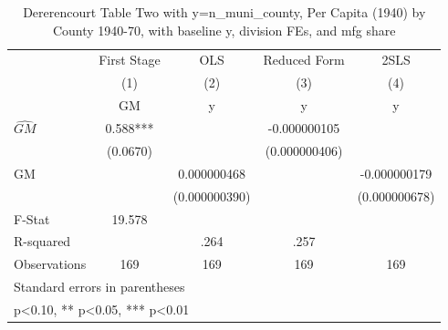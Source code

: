 \begin{table}[htbp]\centering
\def\sym#1{\ifmmode^{#1}\else\(^{#1}\)\fi}
\caption{Dererencourt Table Two with y=n\_muni\_county, Per Capita (1940) by County 1940-70, with baseline y, division FEs, and mfg share}
\begin{tabular}{l*{4}{c}}
\toprule
                    & First Stage   &         OLS   &Reduced Form   &        2SLS   \\
                    &\multicolumn{1}{c}{(1)}&\multicolumn{1}{c}{(2)}&\multicolumn{1}{c}{(3)}&\multicolumn{1}{c}{(4)}\\
                    &\multicolumn{1}{c}{GM}&\multicolumn{1}{c}{y}&\multicolumn{1}{c}{y}&\multicolumn{1}{c}{y}\\
\midrule
$\hat{GM}$          &       0.588***&               &-0.000000105   &               \\
                    &    (0.0670)   &               &(0.000000406)   &               \\
\addlinespace
GM                  &               & 0.000000468   &               &-0.000000179   \\
                    &               &(0.000000390)   &               &(0.000000678)   \\
\midrule
F-Stat              &      19.578   &               &               &               \\
R-squared           &               &        .264   &        .257   &               \\
Observations        &         169   &         169   &         169   &         169   \\
\bottomrule
\multicolumn{5}{l}{\footnotesize Standard errors in parentheses}\\
\multicolumn{5}{l}{\footnotesize * p<0.10, ** p<0.05, *** p<0.01}\\
\end{tabular}
\end{table}
